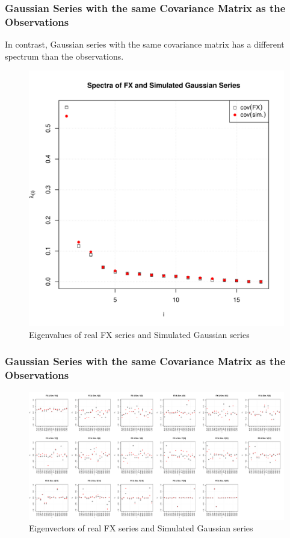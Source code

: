 \documentclass{beamer}
\begin{document}
\begin{frame}
  \frametitle{Gaussian Series with the same Covariance Matrix as the
    Observations}
  In contrast, Gaussian series with the same covariance matrix has a
  different spectrum than the observations.
  \begin{figure}[htb!]
    \centering
    \includegraphics[scale=0.35]{Gaussian_eigenvalues.pdf}
    \caption{\scriptsize Eigenvalues of real FX series and Simulated Gaussian series}
  \end{figure}
\end{frame}

\begin{frame}
  \frametitle{Gaussian Series with the same Covariance Matrix as the Observations}
  \begin{figure}[htb!]
    \centering
    \includegraphics[scale=0.2]{Gaussian_eigenvectors.pdf}
    \caption{\scriptsize Eigenvectors of real FX series and Simulated Gaussian series}
  \end{figure}
\end{frame}
\end{document}
